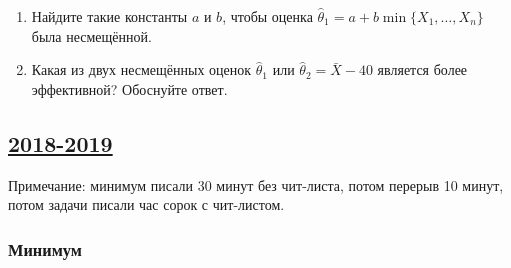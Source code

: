 \begin{enumerate}
  \begin{enumerate}
  \item Найдите такие константы $a$ и $b$, чтобы оценка  $\hat \theta_1 = a + b\min\{X_1, \ldots, X_n\}$ была несмещённой.
  \item Какая из двух несмещённых оценок $\hat \theta_1$ или $\hat \theta_2 = \bar X - 40$ является более эффективной? Обоснуйте ответ.
  \end{enumerate}
  
  \end{enumerate}
  
  



\subsection[2018-2019]{\hyperref[sec:sol_kr_03_2018_2019]{2018-2019}}
\label{sec:kr_03_2018_2019}

Примечание: минимум писали 30 минут без чит-листа, потом перерыв 10 минут,
потом задачи писали час сорок с чит-листом.

\subsubsection*{Минимум}

